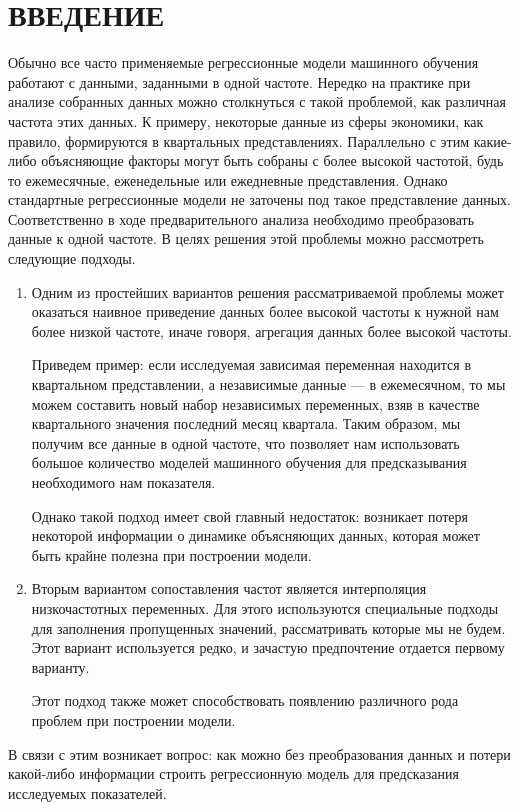 \documentclass[a4paper, 12pt]{extarticle}
\numberwithin{equation}{subsection}
\begin{document}
	\section*{ВВЕДЕНИЕ}
		Обычно все часто применяемые регрессионные модели машинного обучения работают с данными, заданными в одной частоте. Нередко на практике при анализе собранных данных можно столкнуться с такой проблемой, как различная частота этих данных. К примеру, некоторые данные из сферы экономики, как правило, формируются в квартальных представлениях. Параллельно с этим какие-либо объясняющие факторы могут быть собраны с более высокой частотой, будь то ежемесячные, еженедельные или ежедневные представления. Однако стандартные регрессионные модели не заточены под такое представление данных. Соответственно в ходе предварительного анализа необходимо преобразовать данные к одной частоте. В целях решения этой проблемы можно рассмотреть следующие подходы.
	\begin{enumerate}
		\item Одним из простейших вариантов решения рассматриваемой проблемы может оказаться наивное приведение данных более высокой частоты к нужной нам более низкой частоте, иначе говоря, агрегация данных более высокой частоты. 
		
		Приведем пример: если исследуемая зависимая переменная находится в квартальном представлении, а независимые данные --- в ежемесячном, то мы можем составить новый набор независимых переменных, взяв в качестве квартального значения последний месяц квартала. Таким образом, мы получим все данные в одной частоте, что позволяет нам использовать большое количество моделей машинного обучения для предсказывания необходимого нам показателя.
		
		Однако такой подход имеет свой главный недостаток:
		возникает потеря некоторой информации о динамике объясняющих данных, которая может быть крайне полезна при построении модели.
		\item Вторым вариантом сопоставления частот является интерполяция низкочастотных
		переменных. Для этого используются специальные подходы для заполнения пропущенных значений, рассматривать которые мы не будем. Этот вариант используется редко, и зачастую предпочтение отдается первому варианту.
		
		Этот подход также может способствовать появлению различного рода проблем при построении модели.
	\end{enumerate}
	В связи с этим возникает вопрос: как можно без преобразования данных и потери какой-либо информации строить регрессионную модель для предсказания исследуемых показателей. 
	
\end{document}
